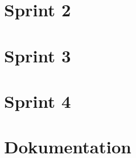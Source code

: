 \documentclass[twoside]{report}
\begin{document}
\newpage

\section{Sprint 2}



\newpage

\section{Sprint 3}

%

\newpage

\section{Sprint 4}



\newpage



\section{Dokumentation}
\end{document}
